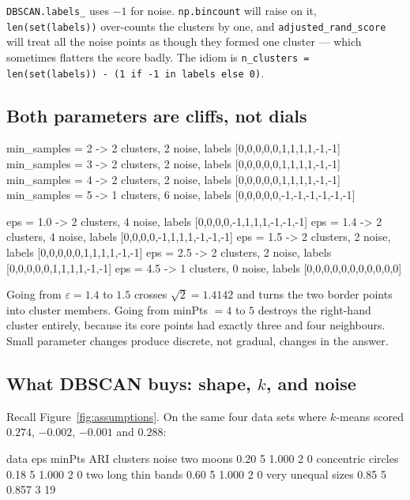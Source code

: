 \documentclass[11pt]{article}
\begin{document}
\begin{caution}
\texttt{DBSCAN.labels\_} uses $-1$ for noise. \texttt{np.bincount} will raise
on it, \texttt{len(set(labels))} over-counts the clusters by one, and
\texttt{adjusted\_rand\_score} will treat all the noise points as though they
formed one cluster --- which sometimes flatters the score badly. The idiom is
\texttt{n\_clusters = len(set(labels)) - (1 if -1 in labels else 0)}.
\end{caution}

\subsection{Both parameters are cliffs, not dials}

\begin{codeout}
  min_samples = 2  ->  2 clusters, 2 noise, labels [0,0,0,0,0,1,1,1,1,-1,-1]
  min_samples = 3  ->  2 clusters, 2 noise, labels [0,0,0,0,0,1,1,1,1,-1,-1]
  min_samples = 4  ->  2 clusters, 2 noise, labels [0,0,0,0,0,1,1,1,1,-1,-1]
  min_samples = 5  ->  1 clusters, 6 noise, labels [0,0,0,0,0,-1,-1,-1,-1,-1,-1]

  eps = 1.0  ->  2 clusters, 4 noise, labels [0,0,0,0,-1,1,1,1,-1,-1,-1]
  eps = 1.4  ->  2 clusters, 4 noise, labels [0,0,0,0,-1,1,1,1,-1,-1,-1]
  eps = 1.5  ->  2 clusters, 2 noise, labels [0,0,0,0,0,1,1,1,1,-1,-1]
  eps = 2.5  ->  2 clusters, 2 noise, labels [0,0,0,0,0,1,1,1,1,-1,-1]
  eps = 4.5  ->  1 clusters, 0 noise, labels [0,0,0,0,0,0,0,0,0,0,0]
\end{codeout}

Going from $\varepsilon = 1.4$ to $1.5$ crosses $\sqrt{2} = 1.4142$ and turns
the two border points into cluster members. Going from minPts $= 4$ to $5$
destroys the right-hand cluster entirely, because its core points had exactly
three and four neighbours. Small parameter changes produce discrete, not
gradual, changes in the answer.

\subsection{What DBSCAN buys: shape, $k$, and noise}

Recall Figure~\ref{fig:assumptions}. On the same four data sets where
$k$-means scored $0.274$, $-0.002$, $-0.001$ and $0.288$:

\begin{codeout}
  data                    eps  minPts   ARI    clusters  noise
  two moons              0.20     5     1.000      2        0
  concentric circles     0.18     5     1.000      2        0
  two long thin bands    0.60     5     1.000      2        0
  very unequal sizes     0.85     5     0.857      3       19
\end{codeout}
\end{document}
